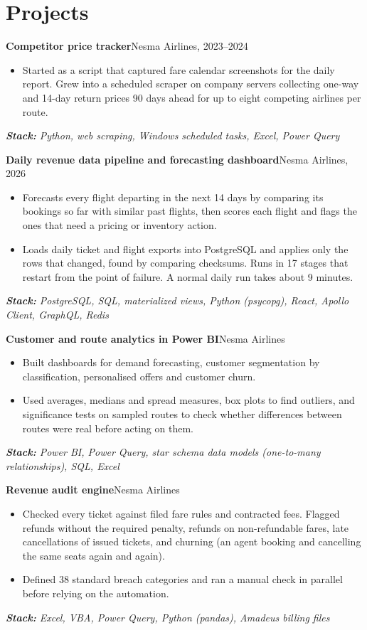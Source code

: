 \documentclass[10pt,a4paper]{article}
\newcommand{\project}[2]{\vspace{4pt}\needspace{3\baselineskip}\textbf{#1}\hfill{\small\color{muted}#2}\par}
\newcommand{\stack}[1]{{\small\itshape\color{muted}\hspace{1.1em}\textbf{Stack:} #1}\par}
\begin{document}
\section{Projects}
\project{Competitor price tracker}{Nesma Airlines, 2023--2024}
\begin{itemize}
  \item Started as a script that captured fare calendar screenshots for the daily report. Grew into a scheduled scraper on company servers collecting one-way and 14-day return prices 90 days ahead for up to eight competing airlines per route.
\end{itemize}
\stack{Python, web scraping, Windows scheduled tasks, Excel, Power Query}

\project{Daily revenue data pipeline and forecasting dashboard}{Nesma Airlines, 2026}
\begin{itemize}
  \item Forecasts every flight departing in the next 14 days by comparing its bookings so far with similar past flights, then scores each flight and flags the ones that need a pricing or inventory action.
  \item Loads daily ticket and flight exports into PostgreSQL and applies only the rows that changed, found by comparing checksums. Runs in 17 stages that restart from the point of failure. A normal daily run takes about 9 minutes.
\end{itemize}
\stack{PostgreSQL, SQL, materialized views, Python (psycopg), React, Apollo Client, GraphQL, Redis}

\project{Customer and route analytics in Power BI}{Nesma Airlines}
\begin{itemize}
  \item Built dashboards for demand forecasting, customer segmentation by classification, personalised offers and customer churn.
  \item Used averages, medians and spread measures, box plots to find outliers, and significance tests on sampled routes to check whether differences between routes were real before acting on them.
\end{itemize}
\stack{Power BI, Power Query, star schema data models (one-to-many relationships), SQL, Excel}

\project{Revenue audit engine}{Nesma Airlines}
\begin{itemize}
  \item Checked every ticket against filed fare rules and contracted fees. Flagged refunds without the required penalty, refunds on non-refundable fares, late cancellations of issued tickets, and churning (an agent booking and cancelling the same seats again and again).
  \item Defined 38 standard breach categories and ran a manual check in parallel before relying on the automation.
\end{itemize}
\stack{Excel, VBA, Power Query, Python (pandas), Amadeus billing files}
\end{document}
